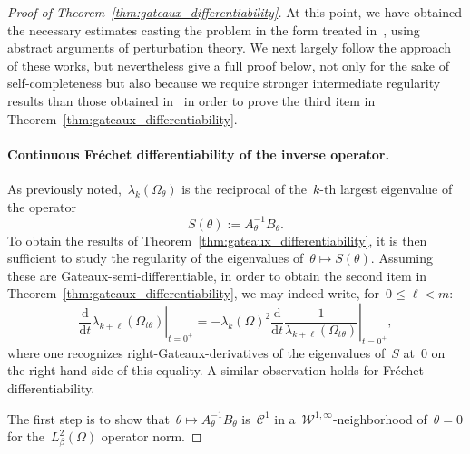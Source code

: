 \documentclass[a4]{article}
\renewcommand{\d}{\mathrm{d}}
\newcommand{\1}{\mathbbm 1}
\newcommand{\Winf}{{{\cW}^{1,\infty}}}
\newcommand{\cW}{\mathcal{W}}
\begin{document}
\begin{proof}[Proof of Theorem~\ref{thm:gateaux_differentiability}]
    At this point, we have obtained the necessary estimates casting the problem in the form treated in~\cite{HR80a,HR80b}, using abstract arguments of perturbation theory. We next largely follow the approach of these works, but nevertheless give a full proof below, not only for the sake of self-completeness but also because we require stronger intermediate regularity results than those obtained in~\cite{HR80a} in order to prove the third item in Theorem~\ref{thm:gateaux_differentiability}.
    \paragraph{Continuous Fréchet differentiability of the inverse operator.}
    As previously noted,~$\lambda_k(\Omega_\theta)$ is the reciprocal of the~$k$-th largest eigenvalue of the operator
    $$S(\theta) := A_\theta^{-1}B_\theta.$$
    To obtain the results of Theorem~\ref{thm:gateaux_differentiability}, it is then sufficient to study the regularity of the eigenvalues of~$\theta\mapsto S(\theta)$.
    Assuming these are Gateaux-semi-differentiable, in order to obtain the second item in Theorem~\ref{thm:gateaux_differentiability}, we may indeed write, for~$0\leq \ell<m$:
    \begin{equation}
        \label{eq:lambda_quotient_rule}
    \left.\frac{\d}{\d t}\lambda_{k+\ell}(\Omega_{t\theta})\right|_{t=0^+} = -\lambda_k(\Omega)^2 \left.\frac{\d}{\d t}\frac{1}{\lambda_{k+\ell}(\Omega_{t\theta})}\right|_{t=0^+},
    \end{equation}
    where one recognizes right-Gateaux-derivatives of the eigenvalues of~$S$ at~$0$ on the right-hand side of this equality. A similar observation holds for Fréchet-differentiability.

    The first step is to show that~$\theta\mapsto A_\theta^{-1}B_\theta$ is~$\mathcal C^1$ in a~$\Winf$-neighborhood of~$\theta=0$ for the~$L^2_\beta(\Omega)$ operator norm. 
    

\end{proof}
\end{document}

